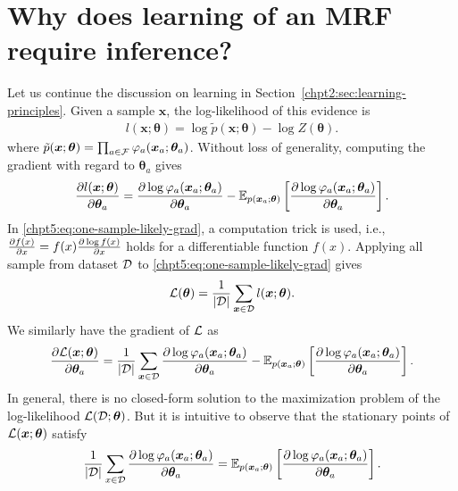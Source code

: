 \section{Why does learning of an MRF require inference?}
\label{chpt5:sec:learning-mrf}
Let us continue the discussion on learning in Section~\ref{chpt2:sec:learning-principles}. Given a sample $\bm{x}$, the log-likelihood of this evidence is
\begin{align}\label{chpt5:eq:one-sample-likely}
  l(\bm{x};\bm{\theta}) = \log{\tilde{p}(\bm{x}; \bm{\theta})} - \log{Z(\bm{\theta})}.
\end{align}
where $\tilde{p}(\bm{x}; \bm{\theta}) =  \prod_{a\in \mathcal{F}} \varphi_a(\bm{x}_a; \bm{\theta}_a)$. 
Without loss of generality, computing the gradient with regard to $\bm{\theta}_a$ gives
\begin{align}\label{chpt5:eq:one-sample-likely-grad}
  \frac{ \partial l(\bm{x};\bm{\theta})}{\partial \bm{\theta}_a} = \frac{ \partial \log{{\varphi_a}(\bm{x}_a; \bm{\theta}_a)}}{\partial \bm{\theta}_a} - \mathbb{E}_{p(\bm{x}_a; \bm{\theta})}\left[ \frac{ \partial \log{{\varphi_a}(\bm{x}_a; \bm{\theta}_a)}}{\partial \bm{\theta}_a} \right].
\end{align}
In \eqref{chpt5:eq:one-sample-likely-grad}, a computation trick is used, i.e., $\frac{ \partial f(x)}{\partial x} = f(x) \frac{ \partial \log{f(x)}}{\partial x}$ holds for a differentiable function $f(x)$. Applying all sample from dataset $\mathcal{D}$ to \eqref{chpt5:eq:one-sample-likely-grad} gives
\begin{equation}\label{chpt4:eq:dataset-likely}
  \mathcal{L}(\bm{\theta}) = \frac{1}{|\mathcal{D} |} \sum_{\bm{x} \in \mathcal{D}} l(\bm{x}; \bm{\theta}).
\end{equation}
We similarly have the gradient of $\mathcal{L}$ as
\begin{equation}\label{chpt5:eq:likely-gradient-thetaa}
  \frac{ \partial \mathcal{L}(\bm{x};\bm{\theta})}{\partial \bm{\theta}_a} = \frac{1}{|\mathcal{D} |} \sum_{\bm{x} \in \mathcal{D}}\frac{ \partial \log{{\varphi_a}(\bm{x}_a; \bm{\theta}_a)}}{\partial \bm{\theta}_a} - \mathbb{E}_{p(\bm{x}_a; \bm{\theta})}\left[ \frac{ \partial \log{{\varphi_a}(\bm{x}_a; \bm{\theta}_a)}}{\partial \bm{\theta}_a} \right].
\end{equation}
In general, there is no closed-form solution to the maximization problem of the log-likelihood $\mathcal{L}(\mathcal{D}; \bm{\theta})$. But it is intuitive to observe that the stationary points of ${\mathcal{L}(\bm{x};\bm{\theta})}$ satisfy
\begin{equation}\label{chpt5:eq:stationary-point-likely}
  \frac{1}{|\mathcal{D} |} \sum_{x \in \mathcal{D}}\frac{ \partial \log{{\varphi_a}(\bm{x}_a; \bm{\theta}_a)}}{\partial \bm{\theta}_a} = \mathbb{E}_{p(\bm{x}_a; \bm{\theta})}\left[ \frac{ \partial \log{{\varphi_a}(\bm{x}_a; \bm{\theta}_a)}}{\partial \bm{\theta}_a} \right].
\end{equation}
